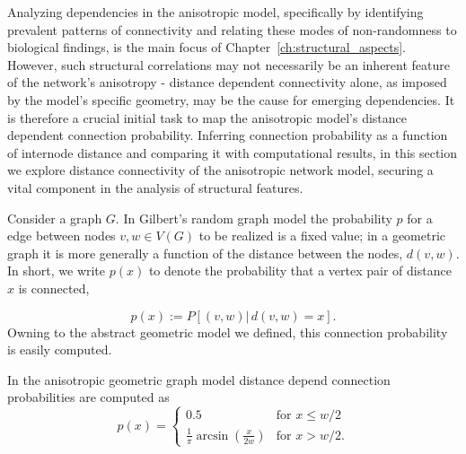 Analyzing dependencies in the anisotropic model, specifically by
identifying prevalent patterns of connectivity and relating these
modes of non-randomness to biological findings, is the main focus of
Chapter~\ref{ch:structural_aspects}. However, such structural
correlations may not necessarily be an inherent feature of the
network's anisotropy - distance dependent connectivity alone, as
imposed by the model's specific geometry, may be the cause for
emerging dependencies. It is therefore a crucial initial task to map
the anisotropic model's distance dependent connection
probability. Inferring connection probability as a function of
internode distance and comparing it with computational results, in
this section we explore distance connectivity of the anisotropic
network model, securing a vital component in the analysis of
structural features.

Consider a graph $G$. In Gilbert's random graph model the probability
$p$ for a edge between nodes $v,w \in V(G)$ to be realized is a fixed
value; in a geometric graph it is more generally a function of the
distance between the nodes, $d(v,w)$. In short, we write $p(x)$ to
denote the probability that a vertex pair of distance $x$ is
connected,

\[p(x) := P\left[(v,w)|\,d(v,w)=x\right].\]
Owning to the abstract geometric model we defined, this connection
probability is easily computed.

\begin{proposition} %
In the anisotropic geometric graph model distance depend connection
probabilities are computed as 
\[
p(x) = \begin{cases} 0.5 & \mathrm{for} \,\, x\le w/2 \\
                       \frac{1}{\pi}
                       \operatorname{arcsin}(\frac{x}{2w}) &
                       \mathrm{for} \,\, x >
                       w/2. \end{cases}
\]
\end{proposition} 

